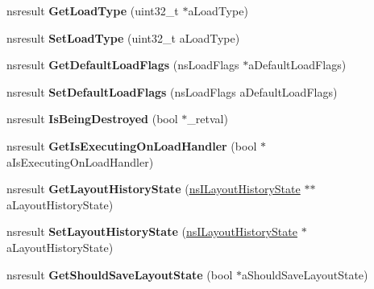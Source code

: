 \begin{DoxyCompactItemize}
nsresult {\bfseries Get\+Load\+Type} (uint32\+\_\+t $\ast$a\+Load\+Type)
\item 
\mbox{\label{interfacens_i_doc_shell_a186f95aa3b956feee3a44efad6483e05}} 
nsresult {\bfseries Set\+Load\+Type} (uint32\+\_\+t a\+Load\+Type)
\item 
\mbox{\label{interfacens_i_doc_shell_a3b645fd916042b7279bf78a29e1e901a}} 
nsresult {\bfseries Get\+Default\+Load\+Flags} (ns\+Load\+Flags $\ast$a\+Default\+Load\+Flags)
\item 
\mbox{\label{interfacens_i_doc_shell_a7548ec3dec4bd777b30d329de93f44cf}} 
nsresult {\bfseries Set\+Default\+Load\+Flags} (ns\+Load\+Flags a\+Default\+Load\+Flags)
\item 
\mbox{\label{interfacens_i_doc_shell_aba00085dd2f2bcea6154fb59064b19cb}} 
nsresult {\bfseries Is\+Being\+Destroyed} (bool $\ast$\+\_\+retval)
\item 
\mbox{\label{interfacens_i_doc_shell_a8c79037e129b51cbfcc746d243e61624}} 
nsresult {\bfseries Get\+Is\+Executing\+On\+Load\+Handler} (bool $\ast$a\+Is\+Executing\+On\+Load\+Handler)
\item 
\mbox{\label{interfacens_i_doc_shell_a7833f40b9e30d43d3692709fa9a52612}} 
nsresult {\bfseries Get\+Layout\+History\+State} (\hyperlink{interfacens_i_supports}{ns\+I\+Layout\+History\+State} $\ast$$\ast$a\+Layout\+History\+State)
\item 
\mbox{\label{interfacens_i_doc_shell_a0653f354bace9e90389d901b40b8c20a}} 
nsresult {\bfseries Set\+Layout\+History\+State} (\hyperlink{interfacens_i_supports}{ns\+I\+Layout\+History\+State} $\ast$a\+Layout\+History\+State)
\item 
\mbox{\label{interfacens_i_doc_shell_a7a5c48bae583ac39aa9b9f705f1591a5}} 
nsresult {\bfseries Get\+Should\+Save\+Layout\+State} (bool $\ast$a\+Should\+Save\+Layout\+State)
\item 
\mbox{\label{interfacens_i_doc_shell_aeab04770c27460a9ba6c56cbb9cc0c56}} 
$$
\end{DoxyCompactItemize}
